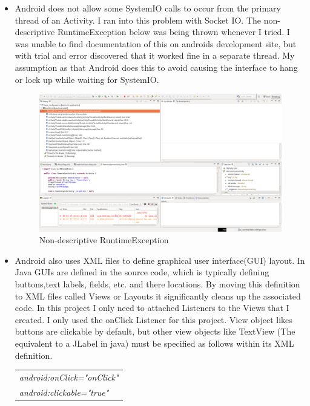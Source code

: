 \documentclass[12pt]{article}
\begin{document}
\begin{itemize}
\item Android does not allow some SystemIO calls to occur from the primary thread of an Activity.  I ran into this problem with Socket IO.  The non-descriptive RuntimeException below was being thrown whenever I tried. I was unable to find documentation of this on androids development site, but with trial and error discovered that it worked fine in a separate thread. My assumption as that Android does this to avoid causing the interface to hang or lock up while waiting for SystemIO.
\begin{figure}[h]
\includegraphics[width=1\textwidth]{runtimeexception.png}
\caption{Non-descriptive RuntimeException}
\end{figure}

\item Android also uses XML files to define graphical user interface(GUI) layout. In Java GUIs are defined in the source code, which is typically defining buttons,text labels, fields, etc. and there locations. By moving this definition to XML files called Views or Layouts it significantly cleans up the associated code. In this project I only need to attached Listeners to the Views that I created. I only used the onClick Listener for this project. View object likes buttons are clickable by default, but other view objects like TextView (The equivalent to a JLabel in java) must be specified as follows within its XML definition.
\begin{center}
\begin{tabular}{|l|}
\hline
\emph{    android:onClick="onClick"}\\  
\emph{    android:clickable="true"}\\
\hline
\end{tabular}
\end{center}


\end{itemize}
\end{document}
